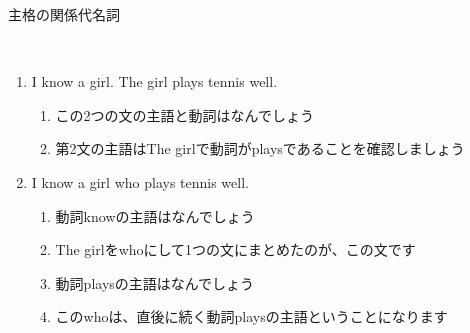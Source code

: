 \documentclass[aspectratio=169,xcolor={dvipsnames,table}]{beamer}
\begin{document}
\begin{frame}[plain]{主格の関係代名詞}

\dbend\,\,\dbend

\bigskip

\begin{enumerate}
 \item<1-> I know a girl. The girl plays tennis well.
       \begin{enumerate}
	\item<2-> この2つの文の主語と動詞はなんでしょう
	\item<3-> 第2文の主語はThe girlで動詞がplaysであることを確認しましょう
       \end{enumerate}
 \item<4-> I know a girl who plays tennis well.
       \begin{enumerate}
	\item<5-> 動詞knowの主語はなんでしょう
	\item<6-> The girlをwhoにして1つの文にまとめたのが、この文です
	\item<7-> 動詞playsの主語はなんでしょう
	\item<8-> このwhoは、直後に続く動詞playsの主語ということになります
       \end{enumerate}
\end{enumerate}

\end{frame}
\end{document}
